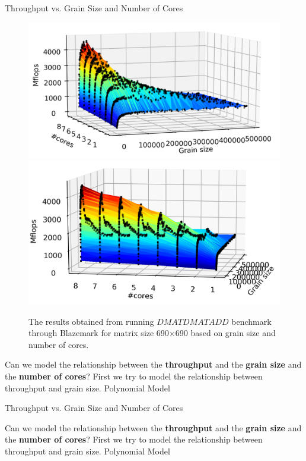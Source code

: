 \documentclass[10pt]{beamer}
\begin{document}
\begin{frame}{Throughput vs. Grain Size and Number of Cores}
	\begin{outline}
		\begin{figure}[H]
			\includegraphics[scale=0.42]{images/fig2.png}					\includegraphics[scale=0.42]{images/fig3.png}
			\caption{The results obtained from running $DMATDMATADD$ benchmark through Blazemark for matrix size 690$\times$690 based on grain size and number of cores.}	
			\label{fig29}
		\end{figure}
\pause
	Can we model the relationship between the \textbf{throughput} and the \textbf{grain size} and the \textbf{number of cores}?
\pause	
\1First we try to model the relationship between throughput and grain size.
\pause	
\2Polynomial Model
\end{outline}
\end{frame}

\begin{frame}{Throughput vs. Grain Size and Number of Cores}
	\begin{outline}
		Can we model the relationship between the \textbf{throughput} and the \textbf{grain size} and the \textbf{number of cores}?
		\pause	
		\1First we try to model the relationship between throughput and grain size.
		\pause	
		\2Polynomial Model

	\end{outline}
\end{frame}
\end{document}
